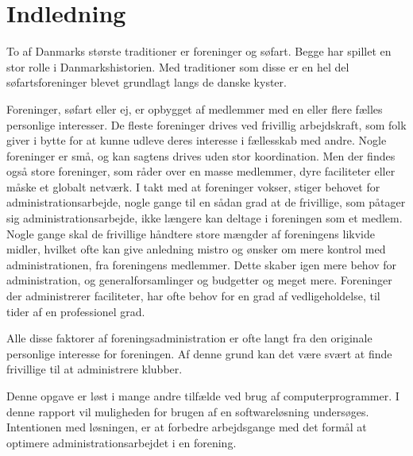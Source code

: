 \chapter{Indledning}


To af Danmarks største traditioner er foreninger og søfart. Begge har spillet en stor rolle i Danmarkshistorien. Med traditioner som disse er en hel del søfartsforeninger blevet grundlagt langs de danske kyster. 

Foreninger, søfart eller ej, er opbygget af medlemmer med en eller flere fælles personlige interesser. De fleste foreninger drives ved frivillig arbejdskraft, som folk giver i bytte for at kunne udleve deres interesse i fællesskab med andre. Nogle foreninger er små, og kan sagtens drives uden stor koordination. Men der findes også store foreninger, som råder over en masse medlemmer, dyre faciliteter eller måske et globalt netværk. I takt med at foreninger vokser, stiger behovet for administrationsarbejde, nogle gange til en sådan grad at de frivillige, som påtager sig administrationsarbejde, ikke længere kan deltage i foreningen som et medlem. Nogle gange skal de frivillige håndtere store mængder af foreningens likvide midler, hvilket ofte kan give anledning mistro og ønsker om mere kontrol med administrationen, fra foreningens medlemmer. Dette skaber igen mere behov for administration, og generalforsamlinger og budgetter og meget mere. Foreninger der administrerer faciliteter, har ofte behov for en grad af vedligeholdelse, til tider af en professionel grad. 

Alle disse faktorer af foreningsadministration er ofte langt fra den originale personlige interesse for foreningen. Af denne grund kan det være svært at finde frivillige til at administrere klubber.



Denne opgave er løst i mange andre tilfælde ved brug af computerprogrammer. I denne rapport vil muligheden for brugen af en softwareløsning undersøges. Intentionen med løsningen, er at forbedre arbejdsgange med det formål at optimere administrationsarbejdet i en forening.


